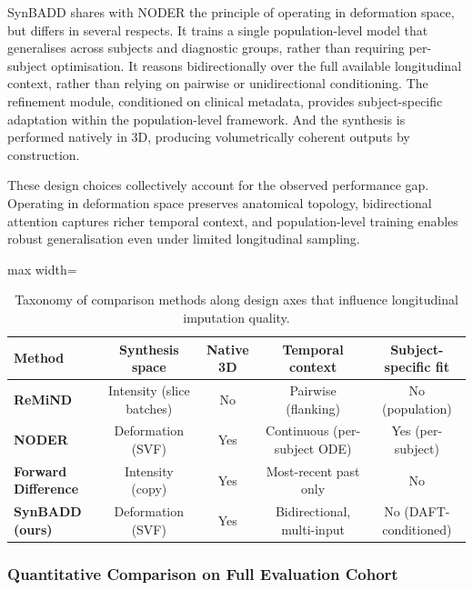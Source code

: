 SynBADD shares with NODER the principle of operating in deformation space, but differs in several respects. It trains a single population-level model that generalises across subjects and diagnostic groups, rather than requiring per-subject optimisation. It reasons bidirectionally over the full available longitudinal context, rather than relying on pairwise or unidirectional conditioning. The refinement module, conditioned on clinical metadata, provides subject-specific adaptation within the population-level framework. And the synthesis is performed natively in 3D, producing volumetrically coherent outputs by construction.

These design choices collectively account for the observed performance gap. Operating in deformation space preserves anatomical topology, bidirectional attention captures richer temporal context, and population-level training enables robust generalisation even under limited longitudinal sampling.

\begin{table}[ht]
\centering
\caption{Taxonomy of comparison methods along design axes that influence longitudinal imputation quality.}
\small
\begin{adjustbox}{max width=\textwidth}
\begin{tabular}{>{\bfseries}lcccc}
\toprule
Method & Synthesis space & Native 3D & Temporal context & Subject-specific fit \\
\midrule
ReMiND & Intensity (slice batches) & No & Pairwise (flanking) & No (population) \\
NODER & Deformation (SVF) & Yes & Continuous (per-subject ODE) & Yes (per-subject) \\
Forward Difference & Intensity (copy) & Yes & Most-recent past only & No \\
\textbf{SynBADD (ours)} & Deformation (SVF) & Yes & Bidirectional, multi-input & No (DAFT-conditioned) \\
\bottomrule
\end{tabular}
\end{adjustbox}
\label{tab:method_taxonomy}
\end{table}

\subsubsection{Quantitative Comparison on Full Evaluation Cohort}

